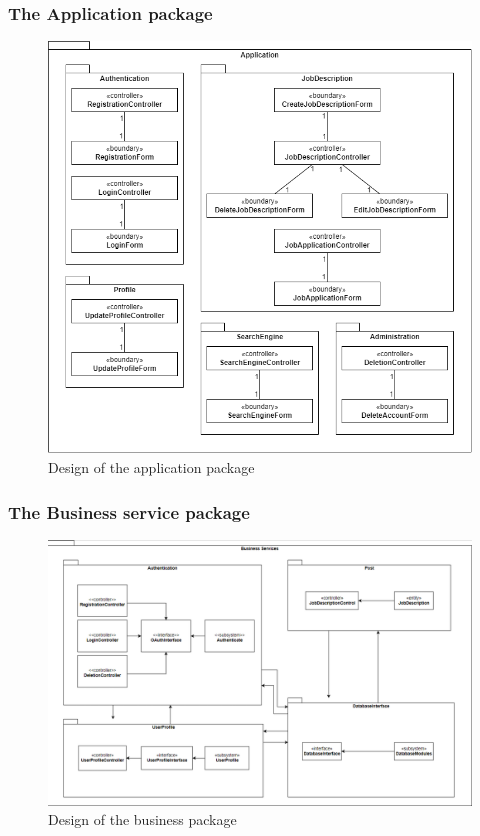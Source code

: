 \documentclass[a4paper]{article}
\begin{document}
\subsubsection{The Application package}
\begin{figure}[H]
  \centering
  \includegraphics[width=1.0\textwidth]{application_package.drawio.png}
  \caption{Design of the application package}
  \label{fig:fig34}
\end{figure}

\subsubsection{The Business service package}
\begin{figure}[H]
  \centering
  \includegraphics[width=1.0\textwidth]{bussiness_package.png}
  \caption{Design of the business package}
  \label{fig:fig35}
\end{figure}
\end{document}
